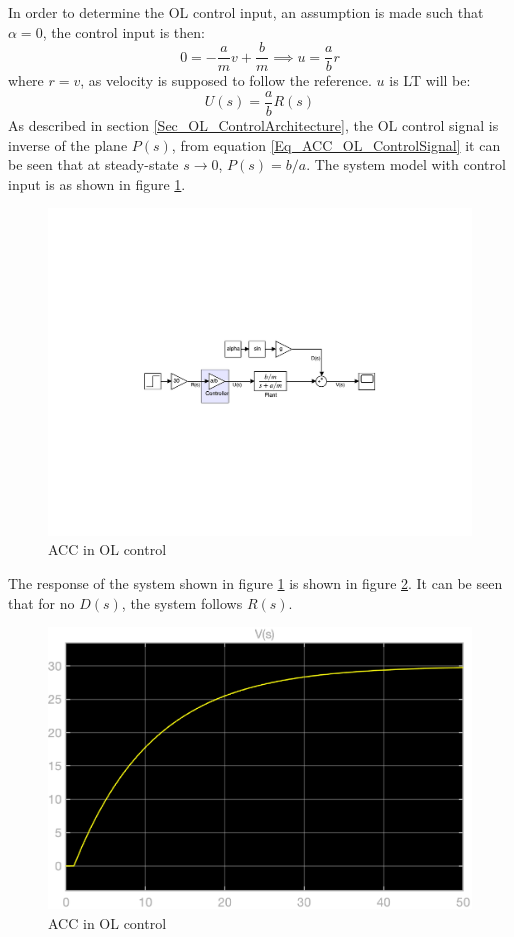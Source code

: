 In order to determine the OL control input, an assumption is made such that $\alpha = 0$, the control input is then:
\begin{equation}
	0 = -\frac{a}{m}v + \frac{b}{m} \implies u = \frac{a}{b} r
\end{equation}
where $r = v$, as velocity is supposed to follow the reference. $u$ is LT will be:
\begin{equation} \label{Eq_ACC_OL_ControlSignal}
	U(s) = \frac{a}{b}R(s)
\end{equation}
As described in section \ref{Sec_OL_ControlArchitecture}, the OL control signal is inverse of the plane $P(s)$, from equation \eqref{Eq_ACC_OL_ControlSignal} it can be seen that at steady-state $s \rightarrow 0$, $P(s) = b/a$. The system model with control input is as shown in figure \ref{Fig_ACC_OL_control}.
\begin{figure}[h!]
	\centering
	\includegraphics[width=\linewidth]{Bilder/ACC_OL}
	\caption{ACC in OL control}
	\label{Fig_ACC_OL_control}
\end{figure}
The response of the system shown in figure \ref{Fig_ACC_OL_control} is shown in figure \ref{Fig_ACC_OL_control_Response}. It can be seen that for no $D(s)$, the system follows $R(s)$.
\begin{figure}[h!]
	\centering
	\includegraphics[width=0.7\linewidth]{Bilder/ACC_OL_response.eps}
	\caption{ACC in OL control}
	\label{Fig_ACC_OL_control_Response}
\end{figure}
